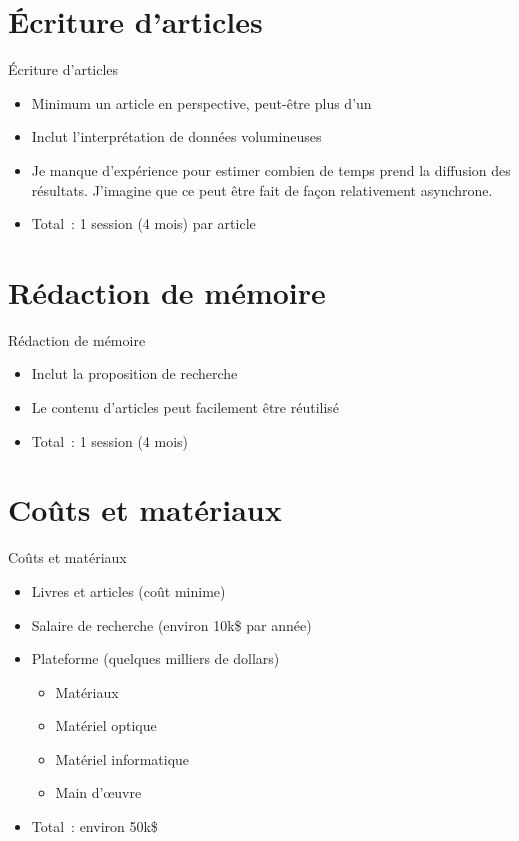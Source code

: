 \documentclass{beamer}
\begin{document}
\section{Écriture d'articles}
\begin{frame}{Écriture d'articles}
	\begin{itemize}
		\item Minimum un article en perspective, peut-être plus d'un
		\item Inclut l'interprétation de données volumineuses
		\item Je manque d'expérience pour estimer combien de temps prend la diffusion des résultats. J'imagine que ce peut être fait de façon relativement asynchrone.
		\item Total~: 1 session (4 mois) par article
	\end{itemize}
\end{frame}

\section{Rédaction de mémoire}
\begin{frame}{Rédaction de mémoire}
	\begin{itemize}
		\item Inclut la proposition de recherche
		\item Le contenu d'articles peut facilement être réutilisé
		\item Total~: 1 session (4 mois)
	\end{itemize}
\end{frame}

\section{Coûts et matériaux}
\begin{frame}{Coûts et matériaux}
	\begin{itemize}
		\item Livres et articles (coût minime)
		\item Salaire de recherche (environ 10k\$ par année)
		\item Plateforme (quelques milliers de dollars)
			\begin{itemize}
				\item Matériaux
				\item Matériel optique
				\item Matériel informatique
				\item Main d'œuvre
			\end{itemize}
		\item Total~: environ 50k\$
	\end{itemize}
\end{frame}
\end{document}
